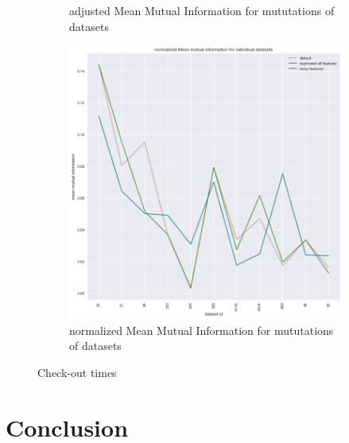 \documentclass[a4paper,10pt]{article}
\begin{document}
\begin{figure}[H]
\begin{subfigure}[b]{0.45\textwidth}
		\caption{adjusted Mean Mutual Information for mututations of datasets}
		\label{fig:AMMI}
	\end{subfigure}
	\begin{subfigure}[b]{0.45\textwidth}
		\includegraphics[width=\textwidth]{images/normalizedMeanMutualInformation.png}
		\caption{normalized Mean Mutual Information for mututations of datasets}
		\label{fig:NMMI}
	\end{subfigure}
	\caption{Check-out times}\label{fig:MMIs}
\end{figure}


\newpage
\section{Conclusion} \label{Chapter6}
\end{document}
